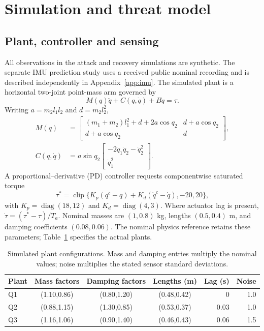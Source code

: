 \documentclass[11pt]{article}
\begin{document}
\section{Simulation and threat model}\label{sec:simulation}
\subsection{Plant, controller and sensing}
All observations in the attack and recovery simulations are synthetic. The separate IMU prediction study uses a received public nominal recording and is described independently in Appendix~\ref{app:imu}. The simulated plant is a horizontal two-joint point-mass arm governed by
\begin{equation}
 M(q)\ddot q+C(q,\dot q)+B\dot q=\tau.
\end{equation}
Writing $a=m_2l_1l_2$ and $d=m_2l_2^2$,
\begin{align}
 M(q)&=\begin{bmatrix}(m_1+m_2)l_1^2+d+2a\cos q_2&d+a\cos q_2\\d+a\cos q_2&d\end{bmatrix},\\
 C(q,\dot q)&=a\sin q_2\begin{bmatrix}-2\dot q_1\dot q_2-\dot q_2^2\\\dot q_1^2\end{bmatrix}.
\end{align}
A proportional--derivative (PD) controller requests componentwise saturated torque
\begin{equation}
 \tau^*=\operatorname{clip}\{K_p(q^c-q)+K_d(\dot q^c-\dot q),-20,20\},
\end{equation}
with $K_p=\operatorname{diag}(18,12)$ and $K_d=\operatorname{diag}(4,3)$. Where actuator lag is present, $\dot\tau=(\tau^*-\tau)/T_a$. Nominal masses are $(1,0.8)$ kg, lengths $(0.5,0.4)$ m, and damping coefficients $(0.08,0.06)$. The nominal physics reference retains these parameters; Table~\ref{tab:plants} specifies the actual plants.

\begin{table}[htbp]\centering\small
\caption{Simulated plant configurations. Mass and damping entries multiply the nominal values; noise multiplies the stated sensor standard deviations.}\label{tab:plants}
\setlength{\tabcolsep}{5pt}
\begin{tabular}{lcccrr}\toprule
Plant & Mass factors & Damping factors & Lengths (m) & Lag (s) & Noise\\\midrule
Q1 & (1.10,0.86) & (0.80,1.20) & (0.48,0.42) & 0 & 1.0\\
Q2 & (0.88,1.15) & (1.30,0.85) & (0.53,0.37) & 0.03 & 1.0\\
Q3 & (1.16,1.06) & (0.90,1.40) & (0.46,0.43) & 0.06 & 1.5\\\bottomrule
\end{tabular}
\end{table}
\end{document}

